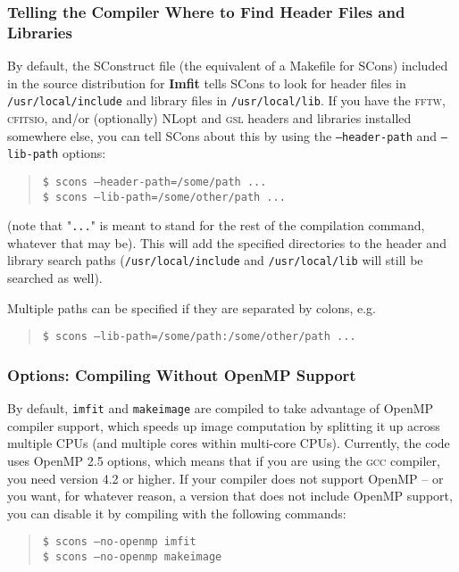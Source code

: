 \documentclass[10pt,a4paper,article]{memoir}
\newcommand{\imfit}{\textbf{Imfit}}
\newcommand{\imfitprog}{\texttt{imfit}}
\newcommand{\makeimage}{\texttt{makeimage}}
\begin{document}
\subsubsection{Telling the Compiler Where to Find Header Files and Libraries}

By default, the SConstruct file (the equivalent of a Makefile for SCons) included
in the source distribution for \imfit{}
tells SCons to look for header files in \texttt{/usr/local/include} and
library files in \texttt{/usr/local/lib}. If you have the \textsc{fftw},
\textsc{cfitsio}, and/or (optionally) NLopt and \textsc{gsl} headers and
libraries installed somewhere else, you can tell SCons about this by
using the
\texttt{--header-path} and \texttt{--lib-path} options:
\begin{quote}
\texttt{\$ scons --header-path=/some/path ...} \\
\texttt{\$ scons --lib-path=/some/other/path ...}
\end{quote}
(note that "\texttt{...}" is meant to stand for the rest of the compilation command,
whatever that may be). This will add the specified directories to the
header and library search paths (\texttt{/usr/local/include} and \texttt{/usr/local/lib}
will still be searched as well).

Multiple paths can be specified if they are separated by colons, e.g.
\begin{quote}
\texttt{\$ scons --lib-path=/some/path:/some/other/path ...} \\
\end{quote}



\subsubsection{Options: Compiling Without OpenMP Support}

By default, \imfitprog{} and \makeimage{} are compiled to take advantage of
OpenMP compiler support, which speeds up image computation by splitting
it up across multiple CPUs (and multiple cores within multi-core CPUs).
Currently, the code uses OpenMP 2.5 options, which means that if you are
using the \textsc{gcc} compiler, you need version 4.2 or higher. If your compiler
does not support OpenMP -- or you want, for whatever reason, a version
that does not include OpenMP support, you can disable it by compiling
with the following commands:
\begin{quote}
\texttt{\$ scons --no-openmp imfit} \\
\texttt{\$ scons --no-openmp makeimage}
\end{quote}
\end{document}
